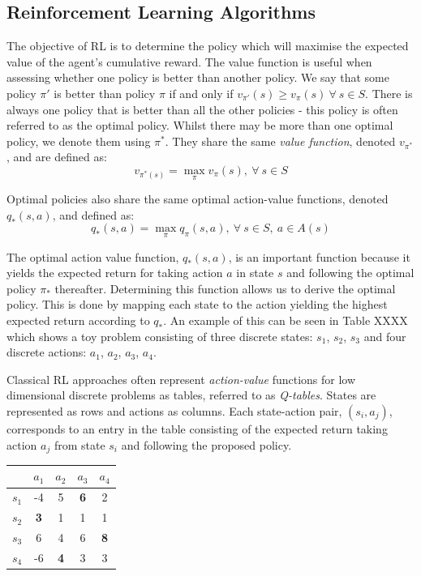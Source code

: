 \documentclass[a4paper]{article}
\begin{document}
\subsection{Reinforcement Learning Algorithms}
The objective of RL is to determine the policy which will maximise the expected value of the agent's cumulative reward. The value function is useful when assessing whether one policy is better than another policy. We say that some policy $\pi'$ is better than policy $\pi$ if and only if $v_{\pi'}(s) \geq v_{\pi}(s) \ \forall \ s \in S$. There is always one policy that is better than all the other policies - this policy is often referred to as the optimal policy. Whilst there may be more than one optimal policy, we denote them using $\pi^*$. They share the same \textit{value function}, denoted $v_{\pi^*}$, and are defined as:
\begin{equation}
v_{\pi^*(s)} = \max_{\pi} v_{\pi}(s), \ \forall \ s \in S
\end{equation}

Optimal policies also share the same optimal action-value functions, denoted $q_*(s,a)$, and defined as:
\begin{equation}
q_*(s,a) = \max_{\pi} q_{\pi}(s,a), \ \forall \ s \in S, \ a \in A(s)
\end{equation}

The optimal action value function, $q_*(s,a)$, is an important function because it yields the expected return for taking action $a$ in state $s$ and following the optimal policy $\pi_*$ thereafter. Determining this function allows us to derive the optimal policy. This is done by mapping each state to the action yielding the highest expected return according to $q_*$. An example of this can be seen in Table XXXX which shows a toy problem consisting of three discrete states: $s_1$, $s_2$, $s_3$ and four discrete actions: $a_1$, $a_2$, $a_3$, $a_4$.\\

\begin{minipage}{0.55\textwidth}
Classical RL approaches often represent \textit{action-value} functions for low dimensional discrete problems as tables, referred to as \textit{Q-tables}. States are represented as rows and actions as columns. Each state-action pair, $(s_i, a_j)$, corresponds to an entry in the table consisting of the expected return taking action $a_j$ from state $s_i$ and following the proposed policy.
\end{minipage}
\hspace{0.5cm}
\begin{minipage}{0.35\textwidth}
\centering
{}
\begin{tabular}{|c|c|c|c|c|}
\hline
 & $a_1$ & $a_2$ & $a_3$ & $a_4$\\
\hline
$s_1$ & -4 & 5 & \textbf{6} & 2 \\
\hline
$s_2$ & \textbf{3} & 1 & 1 & 1 \\
\hline
$s_3$ & 6 & 4 & 6 & \textbf{8} \\
\hline
$s_4$ & -6 & \textbf{4} & 3 & 3 \\
\hline
\end{tabular}
\end{minipage}
\end{document}
